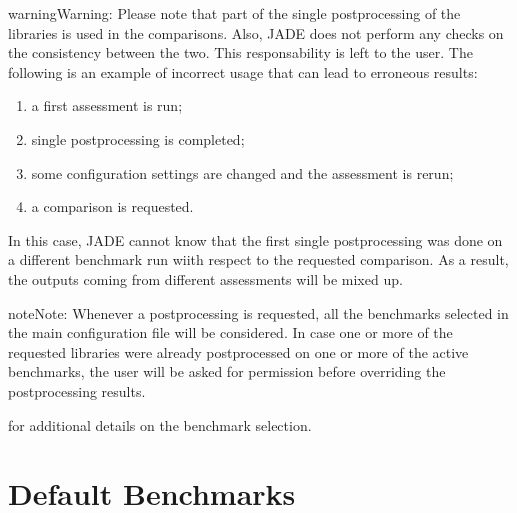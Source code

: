 \documentclass[letterpaper,10pt,english]{sphinxmanual}
\begin{document}
\begin{sphinxadmonition}{warning}{Warning:}
Please note that part of the single post\sphinxhyphen{}processing of the libraries is used in the comparisons. Also, JADE does not perform
any checks on the consistency between the two. This responsability is left to the user.
The following is an example of incorrect usage that can lead to erroneous results:
\begin{enumerate}
%
\item {} 
a first assessment is run;

\item {} 
single post\sphinxhyphen{}processing is completed;

\item {} 
some configuration settings are changed and the assessment is re\sphinxhyphen{}run;

\item {} 
a comparison is requested.

\end{enumerate}

In this case, JADE cannot know that the first single post\sphinxhyphen{}processing was done on a different benchmark run wiith respect
to the requested comparison. As a result, the outputs coming from different assessments will be mixed up.
\end{sphinxadmonition}

\begin{sphinxadmonition}{note}{Note:}
Whenever a post\sphinxhyphen{}processing is requested, all the benchmarks selected in the main configuration file will be considered.
In case one or more of the requested libraries were already post\sphinxhyphen{}processed on one or more of the active benchmarks,
the user will be asked for permission before overriding the post\sphinxhyphen{}processing results.
\end{sphinxadmonition}




{\hyperref[\detokenize{usage/configuration:config}]{}} for additional details on the benchmark selection.




\chapter{Default Benchmarks}
\label{\detokenize{benchmarks/benchmarks:default-benchmarks}}\label{\detokenize{benchmarks/benchmarks::doc}}
\end{document}
